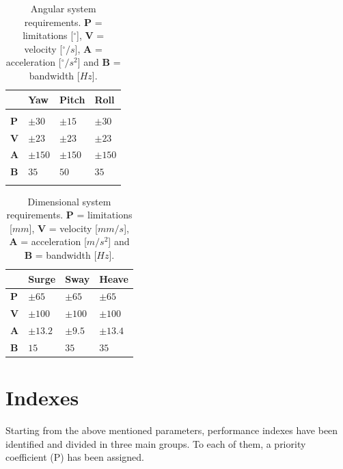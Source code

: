 \documentclass[10.5pt, twocolumn]{article}
\begin{document}
\begin{table}[h]
\centering
\begin{tabular}{C{0.5cm}C{1.3cm}C{1.3cm}C{1.3cm}}
	& \textbf{Yaw} & \textbf{Pitch} & \textbf{Roll} \\
	\hline
	\hline
	\\
	\textbf{P} & \( \pm 30 \) & \( \pm 15 \) & \( \pm 30 \) \\
	\textbf{V} & \( \pm 23 \) & \( \pm 23 \) & \( \pm 23 \) \\
	\textbf{A} & \( \pm 150 \) & \( \pm 150 \) & \( \pm 150 \) \\
	\textbf{B} & \( 35 \) & \( 50 \) & \( 35 \) \\
	\\
	\hline
\end{tabular}
\caption{Angular system requirements. \textbf{P} = limitations [\( ^\circ \)], \textbf{V} = velocity [\( ^\circ/s \)], \textbf{A} = acceleration [\( ^\circ/s^2 \)] and \textbf{B} = bandwidth [\( Hz \)].}
\label{t:SystemRequirements1}
\end{table}
\begin{table}[h]
\centering
\begin{tabular}{C{0.5cm}C{1.3cm}C{1.3cm}C{1.3cm}}
	& \textbf{Surge} & \textbf{Sway} & \textbf{Heave}\\
	\hline
	\hline
	\vspace{0.05cm}\textbf{P} & \vspace{0.05cm}\( \pm 65 \) & \vspace{0.05cm}\( \pm 65 \) & \vspace{0.05cm}\( \pm 65 \) \\
	\textbf{V} & \( \pm 100 \) & \( \pm 100 \) & \( \pm 100 \) \\
	\textbf{A} & \( \pm 13.2 \) & \( \pm 9.5 \) & \( \pm 13.4 \) \\
	\textbf{B} & \( 15 \) & \( 35 \) & \( 35 \)
	\vspace{0.15cm} \\
	\hline
\end{tabular}
\caption{Dimensional system requirements. \textbf{P} = limitations [\( mm \)], \textbf{V} = velocity [\( mm/s \)], \textbf{A} = acceleration [\( m/s^2 \)] and \textbf{B} = bandwidth [\( Hz \)].}
\label{t:SystemRequirements2}
\end{table}


\section{Indexes}
Starting from the above mentioned parameters, performance indexes have been identified and divided in three main groups.
To each of them, a priority coefficient (P) has been assigned.
\end{document}

